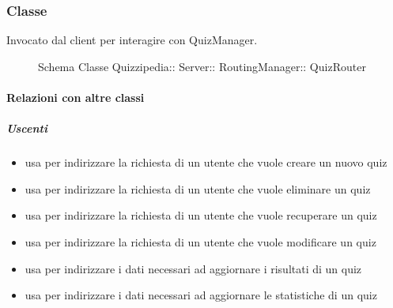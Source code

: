 \subsubsection{Classe }
Invocato dal client per interagire con QuizManager.
\begin{figure}[H]
\centering
\noindent{}
\caption[Schema Classe QuizRouter]{Schema Classe Quizzipedia:: Server:: RoutingManager:: QuizRouter}
\end{figure}
\paragraph{Relazioni con altre classi}
\subparagraph{Uscenti}
\begin{itemize}
\item usa  per indirizzare la richiesta di un utente che vuole creare un nuovo quiz
\item usa  per indirizzare la richiesta di un utente che vuole eliminare un quiz
\item usa  per indirizzare la richiesta di un utente che vuole recuperare un quiz
\item usa  per indirizzare la richiesta di un utente che vuole modificare un quiz
\item usa  per indirizzare i dati necessari ad aggiornare i risultati di un quiz
\item usa  per indirizzare i dati necessari ad aggiornare le statistiche di un quiz
\end{itemize}
